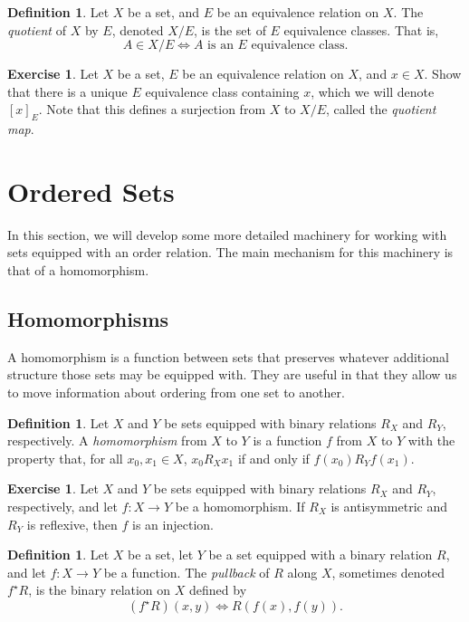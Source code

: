 \documentclass[letterpaper]{article}
\theoremstyle{definition}
\newtheorem{definition}[theorem]{Definition}
\newtheorem{exercise}[theorem]{Exercise}
\newcommand{\defterm}{\emph}
\begin{document}
\begin{definition}
  Let \(X\) be a set, and \(E\) be an equivalence relation on \(X\).
  The \defterm{quotient} of \(X\) by \(E\), denoted \(X/E\), is the
  set of \(E\) equivalence classes.  That is,
  \[A \in X/E \iff A \text{ is an } E \text{ equivalence class.}\]
\end{definition}

\begin{exercise}
  Let \(X\) be a set, \(E\) be an equivalence relation on \(X\), and
  \(x \in X\).  Show that there is a unique \(E\) equivalence class
  containing \(x\), which we will denote \([x]_E\).  Note that this
  defines a surjection from \(X\) to \(X/E\), called the
  \defterm{quotient map}.
\end{exercise}

\section{Ordered Sets}
In this section, we will develop some more detailed machinery for
working with sets equipped with an order relation.  The main mechanism
for this machinery is that of a homomorphism.

\subsection{Homomorphisms}
A homomorphism is a function between sets that preserves whatever
additional structure those sets may be equipped with.  They are useful
in that they allow us to move information about ordering from one set
to another.

\begin{definition}
  Let \(X\) and \(Y\) be sets equipped with binary relations \(R_X\)
  and \(R_Y\), respectively.  A \defterm{homomorphism} from \(X\) to
  \(Y\) is a function \(f\) from \(X\) to \(Y\) with the property
  that, for all \(x_0,x_1 \in X\), \(x_0R_Xx_1\) if and only if
  \(f(x_0)R_Yf(x_1)\).
\end{definition}

\begin{exercise}
  Let \(X\) and \(Y\) be sets equipped with binary relations \(R_X\)
  and \(R_Y\), respectively, and let \(f:X \to Y\) be a homomorphism.
  If \(R_X\) is antisymmetric and \(R_Y\) is reflexive, then \(f\) is
  an injection.
\end{exercise}

\begin{definition}
  Let \(X\) be a set, let \(Y\) be a set equipped with a binary
  relation \(R\), and let \(f:X \to Y\) be a function.  The
  \defterm{pullback} of \(R\) along \(X\), sometimes denoted \(f^\star
  R\), is the binary relation on \(X\) defined by
  \[(f^\star R)(x, y) \iff R(f(x), f(y)) \text{.}\]
\end{definition}
\end{document}
